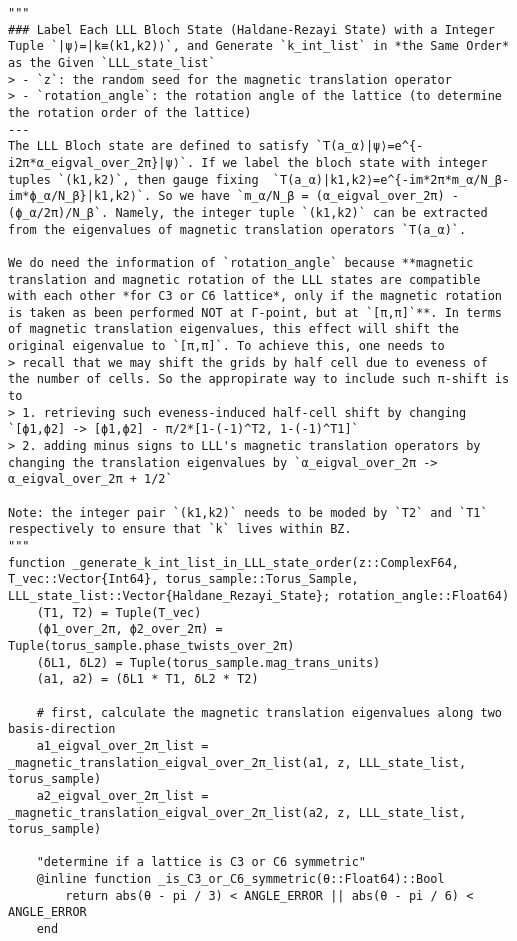 \begin{verbatim}
"""
### Label Each LLL Bloch State (Haldane-Rezayi State) with a Integer Tuple `|ψ⟩=|k≡(k1,k2)⟩`, and Generate `k_int_list` in *the Same Order* as the Given `LLL_state_list`
> - `z`: the random seed for the magnetic translation operator
> - `rotation_angle`: the rotation angle of the lattice (to determine the rotation order of the lattice)
---
The LLL Bloch state are defined to satisfy `T(a_α)|ψ⟩=e^{-i2π*α_eigval_over_2π}|ψ⟩`. If we label the bloch state with integer tuples `(k1,k2)`, then gauge fixing  `T(a_α)|k1,k2⟩=e^{-im*2π*m_α/N_β-im*ϕ_α/N_β}|k1,k2⟩`. So we have `m_α/N_β = (α_eigval_over_2π) - (ϕ_α/2π)/N_β`. Namely, the integer tuple `(k1,k2)` can be extracted from the eigenvalues of magnetic translation operators `T(a_α)`.

We do need the information of `rotation_angle` because **magnetic translation and magnetic rotation of the LLL states are compatible with each other *for C3 or C6 lattice*, only if the magnetic rotation is taken as been performed NOT at Γ-point, but at `[π,π]`**. In terms of magnetic translation eigenvalues, this effect will shift the original eigenvalue to `[π,π]`. To achieve this, one needs to
> recall that we may shift the grids by half cell due to eveness of the number of cells. So the appropirate way to include such π-shift is to
> 1. retrieving such eveness-induced half-cell shift by changing `[ϕ1,ϕ2] -> [ϕ1,ϕ2] - π/2*[1-(-1)^T2, 1-(-1)^T1]`
> 2. adding minus signs to LLL's magnetic translation operators by changing the translation eigenvalues by `α_eigval_over_2π -> α_eigval_over_2π + 1/2`

Note: the integer pair `(k1,k2)` needs to be moded by `T2` and `T1` respectively to ensure that `k` lives within BZ.
"""
function _generate_k_int_list_in_LLL_state_order(z::ComplexF64, T_vec::Vector{Int64}, torus_sample::Torus_Sample, LLL_state_list::Vector{Haldane_Rezayi_State}; rotation_angle::Float64)
    (T1, T2) = Tuple(T_vec)
    (ϕ1_over_2π, ϕ2_over_2π) = Tuple(torus_sample.phase_twists_over_2π)
    (δL1, δL2) = Tuple(torus_sample.mag_trans_units)
    (a1, a2) = (δL1 * T1, δL2 * T2)

    # first, calculate the magnetic translation eigenvalues along two basis-direction
    a1_eigval_over_2π_list = _magnetic_translation_eigval_over_2π_list(a1, z, LLL_state_list, torus_sample)
    a2_eigval_over_2π_list = _magnetic_translation_eigval_over_2π_list(a2, z, LLL_state_list, torus_sample)

    "determine if a lattice is C3 or C6 symmetric"
    @inline function _is_C3_or_C6_symmetric(θ::Float64)::Bool
        return abs(θ - pi / 3) < ANGLE_ERROR || abs(θ - pi / 6) < ANGLE_ERROR
    end


\end{verbatim}
